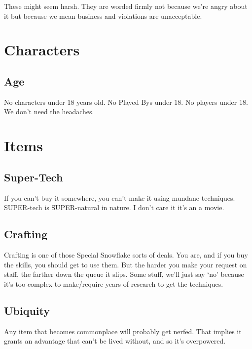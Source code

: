 These might seem harsh. 
They are worded firmly not because we're angry about it but because we mean business and violations are unacceptable.
\section{Characters}
\subsection{Age}
No characters under 18 years old.
No Played Bys under 18.
No players under 18.
We don't need the headaches.
\section{Items}
\subsection{Super-Tech}
If you can't buy it somewhere, you can't make it using mundane techniques.
SUPER-tech is SUPER-natural in nature.
I don't care it it's an a movie.

\subsection{Crafting}
Crafting is one of those Special Snowflake sorts of deals. You are, and if
you buy the skills, you should get to use them. But the harder you make
your request on staff, the farther down the queue it slips. Some stuff,
we'll just say `no' because it's too complex to make/require
years of research to get the techniques.
\subsection{Ubiquity}
Any item that becomes commonplace will probably get nerfed. That implies
it grants an advantage that can't  be lived without, and so it's
overpowered.
